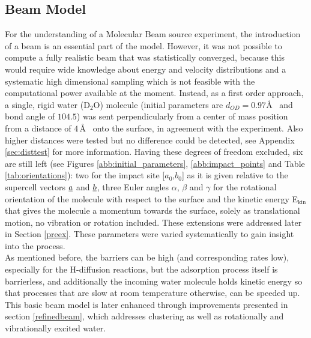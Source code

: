 \documentclass[11pt,DIV=13,BCOR=5mm,a4paper,headinclude]{scrbook}
\begin{document}
\subsection{Beam Model} \label{beammodel}
For the understanding of a Molecular Beam source experiment, the introduction of a beam is an essential part of the model.
However, it was not possible to compute a fully realistic beam that was statistically converged, because this would require wide knowledge about energy and velocity distributions and a systematic high dimensional sampling which is not feasible with the computational power available at the moment.
Instead, as a first order approach, a single, rigid water (D$_2$O) molecule (initial parameters are $d_{OD}=0.97$\AA~ and bond angle of $104.5$\textdegree) was sent perpendicularly from a center of mass position from a distance of $4\,$\AA~ onto the surface, in agreement with the experiment.
Also higher distances were tested but no difference could be detected, see Appendix \ref{sec:disttest} for more information.
Having these degrees of freedom excluded, six are still left (see Figures \ref{abb:initial_parameters}, \ref{abb:impact_points} and Table \ref{tab:orientations}): two for the impact site [$a_0$,$b_0$] as it is given relative to the supercell vectors $\uline{a}$ and $\uline{b}$, three Euler angles $\alpha$, $\beta$ and $\gamma$ for the rotational orientation of the molecule with respect to the surface and the kinetic energy E$_\textrm{kin}$ that gives the molecule a momentum towards the surface, solely as translational motion, no vibration or rotation included.
These extensions were addressed later in Section \ref{preex}.
These parameters were varied systematically to gain insight into the process.
\\
As mentioned before, the barriers can be high (and corresponding rates low), especially for the H-diffusion reactions, but the adsorption process itself is barrierless, and additionally the incoming water molecule holds kinetic energy so that processes that are slow at room temperature otherwise, can be speeded up.
\\
This basic beam model is later enhanced through improvements presented in section \ref{refinedbeam}, which addresses clustering as well as rotationally and vibrationally excited water.
\end{document}
